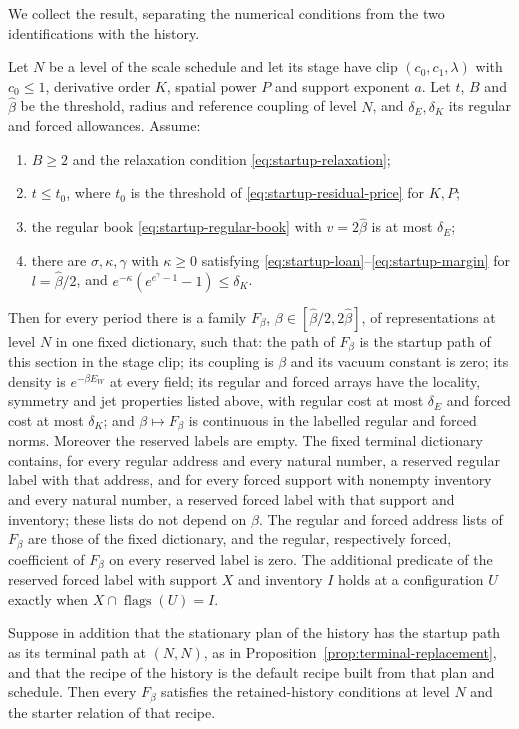 We collect the result, separating the numerical conditions from the
two identifications with the history.

\begin{proposition}
\label{prop:wilson-startup-family}
Let $N$ be a level of the scale schedule and let its stage have clip
$(c_0,c_1,\lambda)$ with $c_0\le1$, derivative order $K$, spatial
power $P$ and support exponent $a$. Let $t$, $B$ and
$\widehat\beta$ be the threshold, radius and reference coupling of
level $N$, and $\delta_E,\delta_K$ its regular and forced allowances.
Assume:
\begin{enumerate}
\item $B\ge2$ and the relaxation condition
 \eqref{eq:startup-relaxation};
\item $t\le t_0$, where $t_0$ is the threshold of
 \eqref{eq:startup-residual-price} for $K,P$;
\item the regular book \eqref{eq:startup-regular-book} with
 $v=2\widehat\beta$ is at most $\delta_E$;
\item there are $\sigma,\kappa,\gamma$ with $\kappa\ge0$ satisfying
 \eqref{eq:startup-loan}--\eqref{eq:startup-margin} for
 $l=\widehat\beta/2$, and
 $e^{-\kappa}(e^{e^\gamma-1}-1)\le\delta_K$.
\end{enumerate}
Then for every period there is a family $F_\beta$,
$\beta\in[\widehat\beta/2,2\widehat\beta]$, of representations at
level $N$ in one fixed dictionary, such that: the path of $F_\beta$ is
the startup path of this section in the stage clip; its coupling is
$\beta$ and its vacuum constant is zero; its density is
$e^{-\beta E_W}$ at every field; its regular and forced arrays have
the locality, symmetry and jet properties listed above, with regular
cost at most $\delta_E$ and forced cost at most $\delta_K$; and
$\beta\mapsto F_\beta$ is continuous in the labelled regular and
forced norms. Moreover the reserved labels are empty. The fixed
terminal dictionary contains, for every regular address and every
natural number, a reserved regular label with that address, and for
every forced support with nonempty inventory and every natural
number, a reserved forced label with that support and inventory;
these lists do not depend on $\beta$. The regular and forced address
lists of $F_\beta$ are those of the fixed dictionary, and the
regular, respectively forced, coefficient of $F_\beta$ on every
reserved label is zero. The additional predicate of the reserved forced
label with support $X$ and inventory $I$ holds at a configuration $U$
exactly when $X\cap\operatorname{flags}(U)=I$.

Suppose in addition that the stationary plan of the history has the
startup path as its terminal path at $(N,N)$, as in
Proposition~\ref{prop:terminal-replacement}, and that the recipe of
the history is the default recipe built from that plan and schedule.
Then every $F_\beta$ satisfies the retained-history conditions at
level $N$ and the starter relation of that recipe.
\end{proposition}
